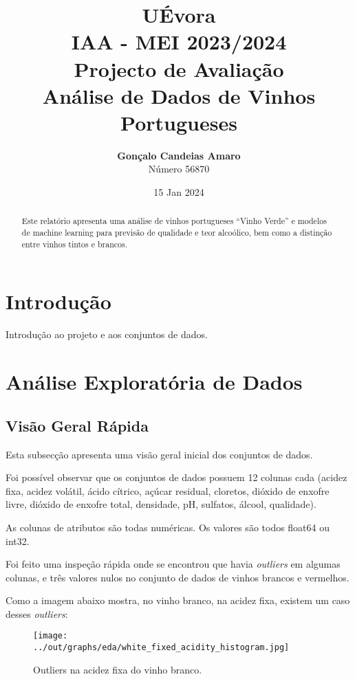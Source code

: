\documentclass{article}
\title{UÉvora\\IAA - MEI 2023/2024\\Projecto de Avaliação\\\textbf{Análise de Dados de Vinhos Portugueses}}
\author{\textbf{Gonçalo Candeias Amaro}\\Número 56870}
\date{15 Jan 2024}
\begin{document}
    \maketitle

    \begin{abstract}
        Este relatório apresenta uma análise de vinhos portugueses ``Vinho Verde'' e modelos de machine learning para previsão de qualidade e teor alcoólico, bem como a distinção entre vinhos tintos e brancos.
    \end{abstract}


    \section{Introdução}
    Introdução ao projeto e aos conjuntos de dados.


    \section{Análise Exploratória de Dados}

    \subsection{Visão Geral Rápida}
    Esta subsecção apresenta uma visão geral inicial dos conjuntos de dados.

    Foi possível observar que os conjuntos de dados possuem 12 colunas cada (acidez fixa, acidez volátil, ácido cítrico, açúcar residual, cloretos, dióxido de enxofre livre, dióxido de enxofre total, densidade, pH, sulfatos, álcool, qualidade).

    As colunas de atributos são todas numéricas. Os valores são todos float64 ou int32.

    Foi feito uma inspeção rápida onde se encontrou que havia \textit{outliers} em algumas colunas, e três valores nulos no conjunto de dados de vinhos brancos e vermelhos.

    Como a imagem abaixo mostra, no vinho branco, na acidez fixa, existem um caso desses \textit{outliers}:

    \begin{figure}
        \centering
        \begin{minipage}{0.90\textwidth}
            \centering
            \texttt{[image: ../out/graphs/eda/white\_fixed\_acidity\_histogram.jpg]}
            \caption{Outliers na acidez fixa do vinho branco.}
            \label{fig:white_fixed_acidity}
        \end{minipage}
    \end{figure}
\end{document}
